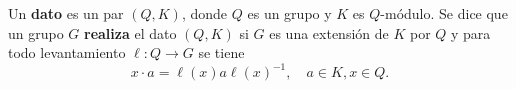 %
%
%
%
%

\begin{definition}
	Un \textbf{dato} es un par $(Q,K)$, donde $Q$ es un grupo y $K$ es
	$Q$-módulo.  Se dice que un grupo $G$ \textbf{realiza} el dato $(Q,K)$ si
	$G$ es una extensión de $K$ por $Q$ y para todo levantamiento $\ell\colon
	Q\to G$ se tiene  
	\[
	x\cdot a=\ell(x)a\ell(x)^{-1},\quad a\in K,x\in Q.
	\]
\end{definition}

